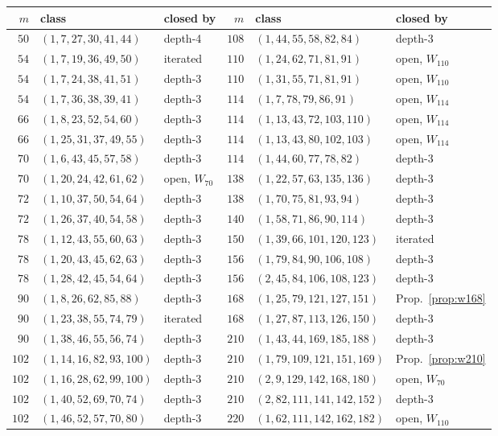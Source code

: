 \documentclass[11pt]{amsart}
\theoremstyle{remark}
\begin{document}
\begin{center}\footnotesize
\begin{tabular}{rlp{1.7cm}rlp{1.7cm}}
\toprule
$m$ & class & closed by & $m$ & class & closed by\\
\midrule
$50$ & $(1,7,27,30,41,44)$ & depth-4 & $108$ & $(1,44,55,58,82,84)$ & depth-3\\
$54$ & $(1,7,19,36,49,50)$ & iterated & $110$ & $(1,24,62,71,81,91)$ & open, $W_{110}$\\
$54$ & $(1,7,24,38,41,51)$ & depth-3 & $110$ & $(1,31,55,71,81,91)$ & open, $W_{110}$\\
$54$ & $(1,7,36,38,39,41)$ & depth-3 & $114$ & $(1,7,78,79,86,91)$ & open, $W_{114}$\\
$66$ & $(1,8,23,52,54,60)$ & depth-3 & $114$ & $(1,13,43,72,103,110)$ & open, $W_{114}$\\
$66$ & $(1,25,31,37,49,55)$ & depth-3 & $114$ & $(1,13,43,80,102,103)$ & open, $W_{114}$\\
$70$ & $(1,6,43,45,57,58)$ & depth-3 & $114$ & $(1,44,60,77,78,82)$ & depth-3\\
$70$ & $(1,20,24,42,61,62)$ & open, $W_{70}$ & $138$ & $(1,22,57,63,135,136)$ & depth-3\\
$72$ & $(1,10,37,50,54,64)$ & depth-3 & $138$ & $(1,70,75,81,93,94)$ & depth-3\\
$72$ & $(1,26,37,40,54,58)$ & depth-3 & $140$ & $(1,58,71,86,90,114)$ & depth-3\\
$78$ & $(1,12,43,55,60,63)$ & depth-3 & $150$ & $(1,39,66,101,120,123)$ & iterated\\
$78$ & $(1,20,43,45,62,63)$ & depth-3 & $156$ & $(1,79,84,90,106,108)$ & depth-3\\
$78$ & $(1,28,42,45,54,64)$ & depth-3 & $156$ & $(2,45,84,106,108,123)$ & depth-3\\
$90$ & $(1,8,26,62,85,88)$ & depth-3 & $168$ & $(1,25,79,121,127,151)$ & Prop.~\ref{prop:w168}\\
$90$ & $(1,23,38,55,74,79)$ & iterated & $168$ & $(1,27,87,113,126,150)$ & depth-3\\
$90$ & $(1,38,46,55,56,74)$ & depth-3 & $210$ & $(1,43,44,169,185,188)$ & depth-3\\
$102$ & $(1,14,16,82,93,100)$ & depth-3 & $210$ & $(1,79,109,121,151,169)$ & Prop.~\ref{prop:w210}\\
$102$ & $(1,16,28,62,99,100)$ & depth-3 & $210$ & $(2,9,129,142,168,180)$ & open, $W_{70}$\\
$102$ & $(1,40,52,69,70,74)$ & depth-3 & $210$ & $(2,82,111,141,142,152)$ & depth-3\\
$102$ & $(1,46,52,57,70,80)$ & depth-3 & $220$ & $(1,62,111,142,162,182)$ & open, $W_{110}$\\
\bottomrule
\end{tabular}
\end{center}
\end{document}
